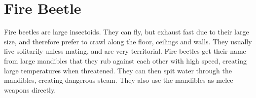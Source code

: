 \section{Fire Beetle}

Fire beetles are large insectoids. They can fly, but exhaust fast due to their large size, and therefore prefer to crawl along the floor, ceilings and walls. They usually live solitarily unless mating, and are very territorial. Fire beetles get their name from large mandibles that they rub against each other with high speed, creating large temperatures when threatened. They can then spit water through the mandibles, creating dangerous steam. They also use the mandibles as melee weapons directly.